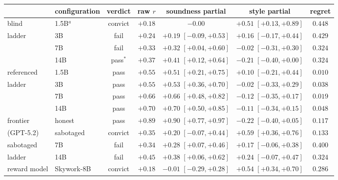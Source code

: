 \documentclass[11pt]{article}
\begin{document}
\begin{table}[t!]
\centering
\small
\setlength{\tabcolsep}{4pt}
\begin{tabular}{llccccc}
\toprule
& configuration & verdict & raw $r$ & soundness partial & style partial & regret \\
\midrule
blind & 1.5B$^{a}$ & convict & $+0.18$ & $-0.00$ & $\mathbf{+0.51}$ {\scriptsize$[+0.13,+0.89]$} & $0.448$ \\
ladder & 3B & fail & $+0.24$ & $+0.19$ {\scriptsize$[-0.09,+0.53]$} & $+0.16$ {\scriptsize$[-0.17,+0.44]$} & $0.429$ \\
& 7B & fail & $+0.33$ & $+0.32$ {\scriptsize$[+0.04,+0.60]$} & $-0.02$ {\scriptsize$[-0.31,+0.30]$} & $0.324$ \\
& 14B & pass$^{*}$ & $+0.37$ & $+0.41$ {\scriptsize$[+0.12,+0.64]$} & $-0.21$ {\scriptsize$[-0.40,+0.00]$} & $0.324$ \\
\midrule
referenced & 1.5B & pass & $+0.55$ & $+0.51$ {\scriptsize$[+0.21,+0.75]$} & $+0.10$ {\scriptsize$[-0.21,+0.44]$} & $\mathbf{0.010}$ \\
ladder & 3B & pass & $+0.55$ & $+0.53$ {\scriptsize$[+0.36,+0.70]$} & $-0.02$ {\scriptsize$[-0.33,+0.29]$} & $0.038$ \\
& 7B & pass & $+0.66$ & $+0.66$ {\scriptsize$[+0.48,+0.82]$} & $-0.12$ {\scriptsize$[-0.35,+0.17]$} & $0.019$ \\
& 14B & pass & $+0.70$ & $+0.70$ {\scriptsize$[+0.50,+0.85]$} & $-0.11$ {\scriptsize$[-0.34,+0.15]$} & $0.048$ \\
\midrule
frontier & honest & pass & $+0.89$ & $+0.90$ {\scriptsize$[+0.77,+0.97]$} & $-0.22$ {\scriptsize$[-0.40,+0.05]$} & $0.117$ \\
(GPT-5.2) & sabotaged & convict & $+0.35$ & $+0.20$ {\scriptsize$[-0.07,+0.44]$} & $\mathbf{+0.59}$ {\scriptsize$[+0.36,+0.76]$} & $0.133$ \\
\midrule
sabotaged & 7B & fail & $+0.34$ & $+0.28$ {\scriptsize$[+0.07,+0.46]$} & $+0.17$ {\scriptsize$[-0.06,+0.38]$} & $0.400$ \\
ladder & 14B & fail & $+0.45$ & $+0.38$ {\scriptsize$[+0.06,+0.62]$} & $+0.24$ {\scriptsize$[-0.07,+0.47]$} & $0.324$ \\
\midrule
reward model & Skywork-8B & convict & $+0.18$ & $-0.01$ {\scriptsize$[-0.29,+0.28]$} & $\mathbf{+0.54}$ {\scriptsize$[+0.34,+0.70]$} & $0.286$ \\
\bottomrule
\end{tabular}


\end{table}
\end{document}
